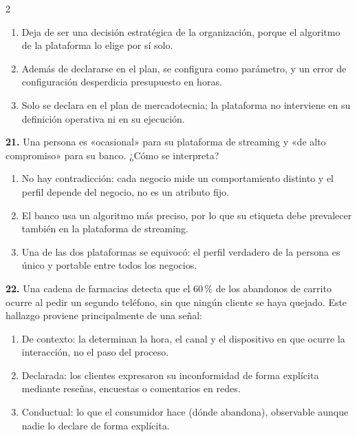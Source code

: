 \documentclass[10pt,letterpaper]{article}
\begin{document}
\begin{multicols}{2}
\vspace{-3pt}
\begin{enumerate}[label=\alph*),leftmargin=1.1em,itemsep=0pt,topsep=1pt,parsep=0pt,partopsep=0pt]
\item Deja de ser una decisión estratégica de la organización, porque el algoritmo de la plataforma lo elige por sí solo.
\item Además de declararse en el plan, se configura como parámetro, y un error de configuración desperdicia presupuesto en horas.
\item Solo se declara en el plan de mercadotecnia; la plataforma no interviene en su definición operativa ni en su ejecución.
\end{enumerate}
\vspace{2pt}
\noindent\textbf{21.} Una persona es «ocasional» para su plataforma de streaming y «de alto compromiso» para su banco. ¿Cómo se interpreta?
\vspace{-3pt}
\begin{enumerate}[label=\alph*),leftmargin=1.1em,itemsep=0pt,topsep=1pt,parsep=0pt,partopsep=0pt]
\item No hay contradicción: cada negocio mide un comportamiento distinto y el perfil depende del negocio, no es un atributo fijo.
\item El banco usa un algoritmo más preciso, por lo que su etiqueta debe prevalecer también en la plataforma de streaming.
\item Una de las dos plataformas se equivocó: el perfil verdadero de la persona es único y portable entre todos los negocios.
\end{enumerate}
\vspace{2pt}
\noindent\textbf{22.} Una cadena de farmacias detecta que el 60\,\% de los abandonos de carrito ocurre al pedir un segundo teléfono, sin que ningún cliente se haya quejado. Este hallazgo proviene principalmente de una señal:
\vspace{-3pt}
\begin{enumerate}[label=\alph*),leftmargin=1.1em,itemsep=0pt,topsep=1pt,parsep=0pt,partopsep=0pt]
\item De contexto: la determinan la hora, el canal y el dispositivo en que ocurre la interacción, no el paso del proceso.
\item Declarada: los clientes expresaron su inconformidad de forma explícita mediante reseñas, encuestas o comentarios en redes.
\item Conductual: lo que el consumidor hace (dónde abandona), observable aunque nadie lo declare de forma explícita.

\end{enumerate}
\end{multicols}
\end{document}
